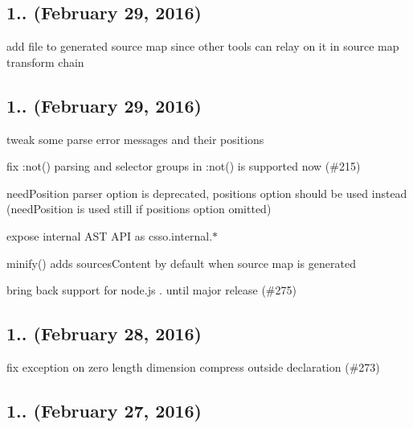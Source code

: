 \subsection*{1.. (February 29, 2016)}


\begin{DoxyItemize}
\item add {\ttfamily file} to generated source map since other tools can relay on it in source map transform chain
\end{DoxyItemize}

\subsection*{1.. (February 29, 2016)}


\begin{DoxyItemize}
\item tweak some parse error messages and their positions
\item fix {\ttfamily \+:not()} parsing and selector groups in {\ttfamily \+:not()} is supported now (\#215)
\item {\ttfamily need\+Position} parser option is deprecated, {\ttfamily positions} option should be used instead ({\ttfamily need\+Position} is used still if {\ttfamily positions} option omitted)
\item expose internal A\+ST A\+PI as {\ttfamily csso.\+internal.$\ast$}
\item {\ttfamily minify()} adds {\ttfamily sources\+Content} by default when source map is generated
\item bring back support for node.\+js {.} until major release (\#275)
\end{DoxyItemize}

\subsection*{1.. (February 28, 2016)}


\begin{DoxyItemize}
\item fix exception on zero length dimension compress outside declaration (\#273)
\end{DoxyItemize}

\subsection*{1.. (February 27, 2016)}



